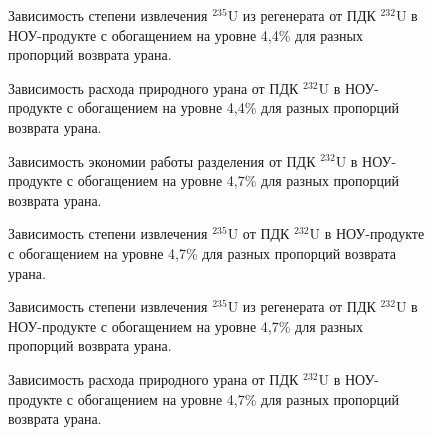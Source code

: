 \begin{figure}
    \centering
    \begin{minipage}{.5\textwidth}
      \centering
      
\caption{{Зависимость степени извлечения $^{235}$U из регенерата от ПДК $^{232}$U в НОУ-продукте с обогащением на уровне 4,4\% для разных пропорций возврата урана.{\label{exR44}}}}
    \end{minipage}%
    \begin{minipage}{.5\textwidth}
      \centering
      
\caption{{Зависимость расхода природного урана от ПДК $^{232}$U в НОУ-продукте с обогащением на уровне 4,4\% для разных пропорций возврата урана.{\label{F0R44}}}}
    \end{minipage}
\end{figure}


\begin{figure}
    \centering
    \begin{minipage}{.5\textwidth}
      \centering
      
\caption{{Зависимость экономии работы разделения от ПДК $^{232}$U в НОУ-продукте с обогащением на уровне 4,7\% для разных пропорций возврата урана.{\label{sw47}}}}
    \end{minipage}%
    \begin{minipage}{.5\textwidth}
      \centering
      
\caption{{Зависимость степени извлечения $^{235}$U от ПДК $^{232}$U в НОУ-продукте с обогащением на уровне 4,7\% для разных пропорций возврата урана.{\label{ex47}}}}
\end{minipage}
\end{figure}

\begin{figure}
    \centering
    \begin{minipage}{.5\textwidth}
      \centering
      
\caption{{Зависимость степени извлечения $^{235}$U из регенерата от ПДК $^{232}$U в НОУ-продукте с обогащением на уровне 4,7\% для разных пропорций возврата урана.{\label{exR47}}}}
    \end{minipage}%
    \begin{minipage}{.5\textwidth}
      \centering
      
\caption{{Зависимость расхода природного урана от ПДК $^{232}$U в НОУ-продукте с обогащением на уровне 4,7\% для разных пропорций возврата урана.{\label{F0R47}}}}
\end{minipage}
\end{figure}



